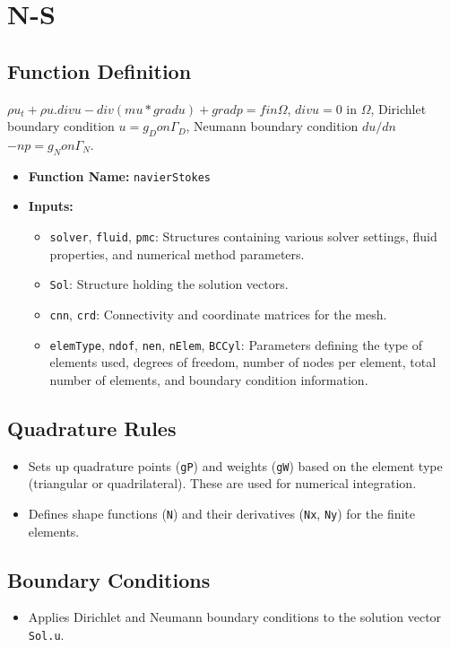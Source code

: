 \documentclass[a4paper,12pt]{article} %
\begin{document}
\section{N-S}
\subsection*{Function Definition}

$\rho u_t + \rho u.div u - div(mu*grad u) + grad p = f in \Omega$,    
$div u = 0$  in $\Omega$,                           
Dirichlet boundary condition        $u = g_D  on \Gamma_D$,         
Neumann boundary condition $du/dn$ $- np = g_N  on \Gamma_N$. 

\begin{itemize}
    \item \textbf{Function Name:} \texttt{navierStokes}
    \item \textbf{Inputs:} 
    \begin{itemize}
        \item \texttt{solver}, \texttt{fluid}, \texttt{pmc}: Structures containing various solver settings, fluid properties, and numerical method parameters.
        \item \texttt{Sol}: Structure holding the solution vectors.
        \item \texttt{cnn}, \texttt{crd}: Connectivity and coordinate matrices for the mesh.
        \item \texttt{elemType}, \texttt{ndof}, \texttt{nen}, \texttt{nElem}, \texttt{BCCyl}: Parameters defining the type of elements used, degrees of freedom, number of nodes per element, total number of elements, and boundary condition information.
    \end{itemize}
\end{itemize}

\subsection*{Quadrature Rules}
\begin{itemize}
    \item Sets up quadrature points (\texttt{gP}) and weights (\texttt{gW}) based on the element type (triangular or quadrilateral). These are used for numerical integration.
    \item Defines shape functions (\texttt{N}) and their derivatives (\texttt{Nx}, \texttt{Ny}) for the finite elements.
\end{itemize}

\subsection*{Boundary Conditions}
\begin{itemize}
    \item Applies Dirichlet and Neumann boundary conditions to the solution vector \texttt{Sol.u}.
\end{itemize}
\end{document}
